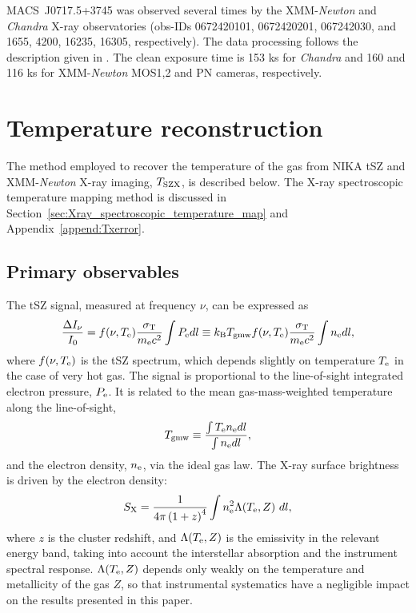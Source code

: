 \documentclass[twocolumn,traditabstract]{aa}
\def\TSZ {T_{\rm SZX}}
\def\TMW {T_{\rm gmw}}
\begin{document}
\mbox{MACS~J0717.5+3745} was observed several times by the XMM-\textit{Newton} and \textit{Chandra} X-ray observatories (obs-IDs 0672420101, 0672420201, 067242030, and 1655, 4200, 16235, 16305, respectively). The data processing follows the description given in \cite{Adam2016b}. The clean exposure time is 153 ks for \textit{Chandra} and 160 and 116 ks for XMM-\textit{Newton} MOS1,2 and PN cameras, respectively.

\section{Temperature reconstruction}\label{sec:method}
The method employed to recover the temperature of the gas from NIKA tSZ and XMM-\textit{Newton} X-ray imaging, $\TSZ$, is described below. The X-ray spectroscopic temperature mapping method is discussed in Section~\ref{sec:Xray_spectroscopic_temperature_map} and Appendix~\ref{append:Txerror}.

\subsection{Primary observables}
The tSZ signal, measured at frequency $\nu$, can be expressed as
\begin{equation}
	\frac{\Delta I_{\nu}}{I_0} = f(\nu, T_{\rm e}) \frac{\sigma_{\rm T}}{m_{\rm e} c^2} \int P_{\rm e} dl \equiv k_{\rm B} \TMW f(\nu, T_{\rm e}) \frac{\sigma_{\rm T}}{m_{\rm e} c^2} \int n_{\rm e} dl,
\label{eq:dIsz}
\end{equation}
where $f(\nu, T_{\rm e})$ is the tSZ spectrum, which depends slightly on temperature $T_{\rm e}$ in the case of very hot gas. The signal is proportional to the line-of-sight integrated electron pressure, $P_{\rm e}$. It is related to the mean gas-mass-weighted temperature along the line-of-sight, 
\begin{equation}
       \TMW  \equiv \frac{\int T_{\rm e} n_{\rm e} dl}{\int n_{\rm e} dl},
        \label{eq:Tgmw_def}
\end{equation}
and the electron density, $n_{\rm e}$, via the ideal gas law. The X-ray surface brightness is driven by the electron density:
\begin{equation}
        S_{\rm X}= \frac{1}{4 \pi \left(1+z\right)^4} \int n_{\rm e}^2 \Lambda(T_{\rm e}, Z) \ dl,
        \label{eq:sx}
\end{equation}
where $z$ is the cluster redshift, and $\Lambda(T_{\rm e}, Z)$ is the emissivity in the relevant energy band, taking into account the interstellar absorption and the instrument spectral response. $\Lambda(T_{\rm e}, Z)$ depends only weakly on the temperature and metallicity of the gas $Z$, so that instrumental systematics have a negligible impact on the results presented in this paper.
\end{document}
